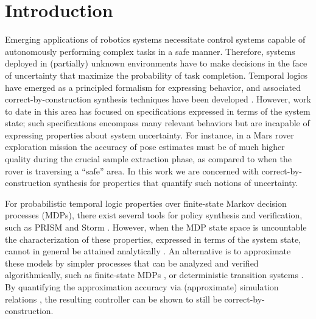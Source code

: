 \documentclass{ifacconf}
\begin{document}
\section{Introduction}\label{subsec:intro}
Emerging applications of robotics systems necessitate control systems capable of autonomously performing complex tasks in a safe manner. Therefore, systems deployed in (partially) unknown environments have to make decisions in the face of uncertainty that maximize the probability of task completion. Temporal logics have emerged as a principled formalism for expressing behavior, and associated correct-by-construction synthesis techniques have been developed \citep{Murray2009}. However, work to date in this area has focused on specifications expressed in terms of the system state; such specifications encompass many relevant behaviors but are incapable of expressing properties about system uncertainty. For instance, in a Mars rover exploration mission the accuracy of pose estimates must be of much higher quality during the crucial sample extraction phase, as compared to when the rover is traversing a ``safe'' area. In this work we are concerned with correct-by-construction synthesis for properties that quantify such notions of uncertainty.


For probabilistic temporal logic properties over finite-state Markov decision processes (MDPs), there exist several tools for policy synthesis and verification, such as PRISM \citep{KNP11} and  Storm \citep{dehnert2017storm}. However, when the MDP state space is uncountable the characterization of these properties, expressed in terms of the system state, cannot in general be attained analytically \citep{Abate1}. An alternative is to approximate these models by simpler processes that can be analyzed and verified algorithmically, such as finite-state MDPs \citep{soudjani2015faust}, or deterministic transition systems \citep{Zamani2014}. By quantifying the approximation accuracy via (approximate) simulation relations \citep{Zamani2014,haesaert2017verification,tech_report_TACAS}, the resulting controller can be shown to still be correct-by-construction.
\end{document}
